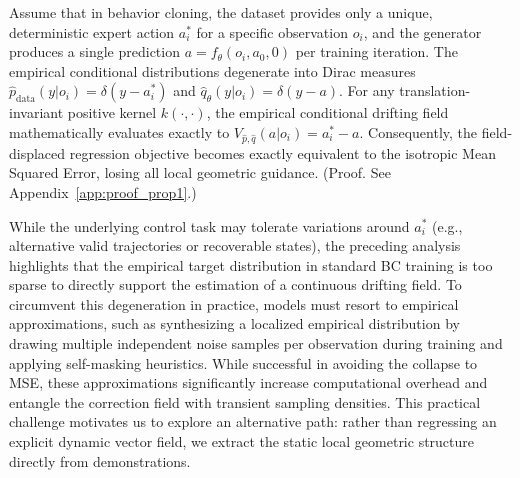 \begin{proposition}
    \label{prop:degeneration_explicit_drifting}
    
    Assume that in behavior cloning, the dataset provides only a unique, 
    deterministic expert action \(a_i^*\) for a specific observation \(o_i\), 
    and the generator produces a single prediction \(a = f_\theta(o_i, a_0, 0)\) per training iteration. 
    The empirical conditional distributions degenerate into Dirac measures \(\hat{p}_{\text{data}}(y | o_i) = \delta(y - a_i^*)\) 
    and \(\hat{q}_\theta(y | o_i) = \delta(y - a)\). For any translation-invariant positive kernel \(k(\cdot, \cdot)\), 
    the empirical conditional drifting field mathematically evaluates exactly to \(V_{\hat{p},\hat{q}}(a | o_i) = a_i^* - a\). 
    Consequently, the field-displaced regression objective becomes exactly equivalent to the isotropic Mean Squared Error, 
    losing all local geometric guidance. (Proof. See Appendix~\ref{app:proof_prop1}.)
\end{proposition}

While the underlying control task may tolerate variations around \(a_i^*\) 
(e.g., alternative valid trajectories or recoverable states), 
the preceding analysis highlights that the empirical target distribution in standard BC training is too sparse to directly support the estimation of a continuous drifting field. 
To circumvent this degeneration in practice, models must resort to empirical approximations, 
such as synthesizing a localized empirical distribution by drawing multiple independent noise samples per observation during training and applying self-masking heuristics. 
While successful in avoiding the collapse to MSE, 
these approximations significantly increase computational overhead and entangle the correction field with transient sampling densities. 
This practical challenge motivates us to explore an alternative path: 
rather than regressing an explicit dynamic vector field, 
we extract the static local geometric structure directly from demonstrations.


